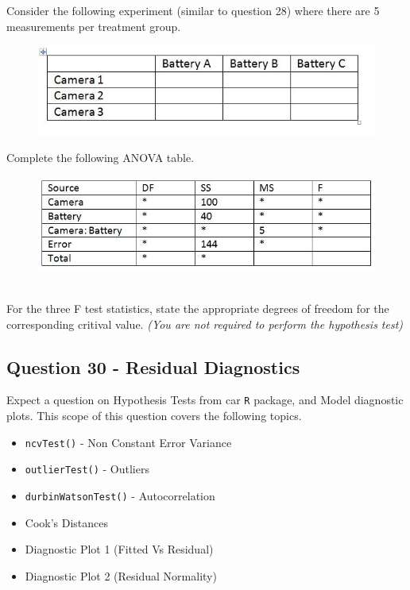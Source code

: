 \documentclass[a4paper,12pt]{article}
\begin{document}
Consider the following experiment (similar to question 28) where there are 5 measurements per treatment group.
\begin{figure}[h!]
	\centering
	\includegraphics[width=0.8\linewidth]{image/Q29Review}
\end{figure}
Complete the following ANOVA table.\\ \bigskip
\begin{figure}[h!]
	\centering
	\includegraphics[width=0.8\linewidth]{image/Q29Review2}
\end{figure}\\


For the three F test statistics, state the appropriate degrees of freedom for the corresponding critival value. \textit{(You are not required to perform the hypothesis test)}
\newpage
\subsection*{Question 30 - Residual Diagnostics}
Expect a question on Hypothesis Tests from car \texttt{R} package, and Model diagnostic plots. This scope of this question covers the following topics.
\begin{itemize}
	\item \texttt{ncvTest()} - Non Constant Error Variance
	\item \texttt{outlierTest()} - Outliers
	\item \texttt{durbinWatsonTest()}  - Autocorrelation
	\item Cook's Distances
	\item Diagnostic Plot 1 (Fitted Vs Residual)
	\item Diagnostic Plot 2 (Residual Normality) 
\end{itemize}
\newpage
\end{document}
